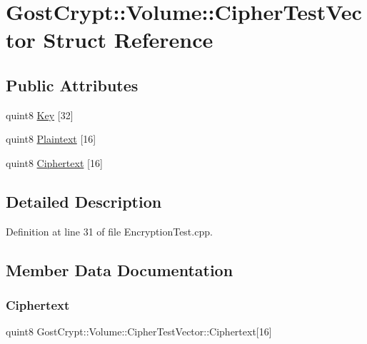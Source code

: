 \hypertarget{struct_gost_crypt_1_1_volume_1_1_cipher_test_vector}{}\section{Gost\+Crypt\+:\+:Volume\+:\+:Cipher\+Test\+Vector Struct Reference}
\label{struct_gost_crypt_1_1_volume_1_1_cipher_test_vector}
\subsection*{Public Attributes}
\begin{DoxyCompactItemize}
\item 
quint8 \hyperlink{struct_gost_crypt_1_1_volume_1_1_cipher_test_vector_a4fc528f41db39617e92dad01f5dc05d7}{Key} \mbox{[}32\mbox{]}
\item 
quint8 \hyperlink{struct_gost_crypt_1_1_volume_1_1_cipher_test_vector_a6944ae7456443265db5280f69f13d25f}{Plaintext} \mbox{[}16\mbox{]}
\item 
quint8 \hyperlink{struct_gost_crypt_1_1_volume_1_1_cipher_test_vector_a40ecc35226f87fc842cd305d721560ea}{Ciphertext} \mbox{[}16\mbox{]}
\end{DoxyCompactItemize}


\subsection{Detailed Description}


Definition at line 31 of file Encryption\+Test.\+cpp.



\subsection{Member Data Documentation}
\mbox{\label{struct_gost_crypt_1_1_volume_1_1_cipher_test_vector_a40ecc35226f87fc842cd305d721560ea}} 
\subsubsection{\texorpdfstring{Ciphertext}{Ciphertext}}
{\footnotesize\ttfamily quint8 Gost\+Crypt\+::\+Volume\+::\+Cipher\+Test\+Vector\+::\+Ciphertext\mbox{[}16\mbox{]}}



